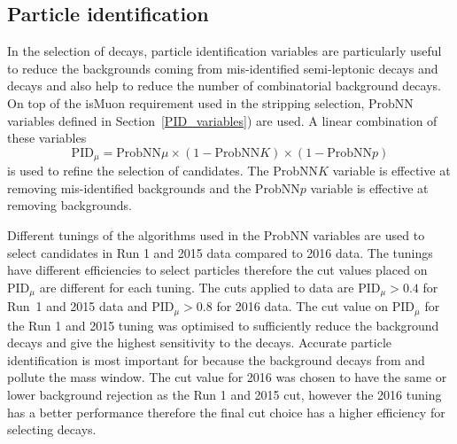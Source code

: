 


\subsection{Particle identification}
\label{sec:BFpid}

In the selection of \bmumu decays, particle identification variables are particularly useful to reduce the backgrounds coming from mis-identified semi-leptonic decays and \bhh decays and also help to reduce the number of combinatorial background decays. On top of the isMuon requirement used in the stripping selection, ProbNN variables defined in Section~\ref{PID_variables}) are used. A linear combination of these variables
\begin{equation}
\text{PID}_{\mu} = \text{ProbNN}\mu \times(1 -  \text{ProbNN}K)  \times(1 -  \text{ProbNN}p) 
\end{equation}
is used to refine the selection of \bmumu candidates. The ProbNN$K$ variable is effective at removing mis-identified \bhh backgrounds and the ProbNN$p$ variable is effective at removing \lambdab backgrounds. 

Different tunings of the algorithms used in the ProbNN variables are used to select candidates in Run 1 and 2015 data compared to 2016 data. The tunings have different efficiencies to select particles therefore the cut values placed on PID$_{\mu}$ are different for each tuning. The cuts applied to data are $\text{PID}_{\mu} > 0.4$ for Run~1 and 2015 data and $\text{PID}_{\mu} > 0.8$ for 2016 data. 
The cut value on PID$_{\mu}$ for the Run 1 and 2015 tuning was optimised to sufficiently reduce the background decays and give the highest sensitivity to the \bdmumu decays. Accurate particle identification is most important for \bdmumu because the background decays from \bhh and \lambdab pollute the \bd mass window. The cut value for 2016 was chosen to have the same or lower background rejection as the Run 1 and 2015 cut, however the 2016 tuning has a better performance therefore the final cut choice has a higher efficiency for selecting \bmumu decays. 

